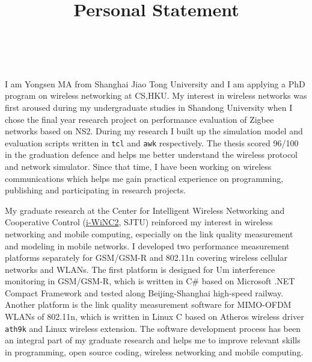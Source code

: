 \documentclass[conference,onecolumn]{IEEEtran}
\title{Personal Statement}
\author{\IEEEauthorblockN{Yongsen MA} \\
}
\begin{document}
\maketitle%

I am Yongsen MA from Shanghai Jiao Tong University and I am applying a PhD program on wireless networking at CS,HKU. My interest in wireless networks was first aroused during my undergraduate studies in Shandong University when I chose the final year research project on performance evaluation of Zigbee networks based on NS2. During my research I built up the simulation model and evaluation scripts written in \verb"tcl" and \verb"awk" respectively. The thesis scored 96/100 in the graduation defence and helps me better understand the wireless protocol and network simulator. Since that time, I have been working on wireless communications which helps me gain practical experience on programming, publishing and participating in research projects.

My graduate research at the Center for Intelligent Wireless Networking and Cooperative Control (\href{http://wicnc.sjtu.edu.cn}{i-WiNC2}, SJTU) reinforced my interest in wireless networking and mobile computing, especially on the link quality measurement and modeling in mobile networks. I developed two performance measurement platforms separately for GSM/GSM-R and 802.11n covering wireless cellular networks and WLANs. The first platform is designed for Um interference monitoring in GSM/GSM-R, which is written in C\# based on Microsoft .NET Compact Framework and tested along Beijing-Shanghai high-speed railway. Another platform is the link quality measurement software for MIMO-OFDM WLANs of 802.11n, which is written in Linux C based on Atheros wireless driver \texttt{ath9k} and Linux wireless extension. The software development process has been an integral part of my graduate research and helps me to improve relevant skills in programming, open source coding, wireless networking and mobile computing.
\end{document}
